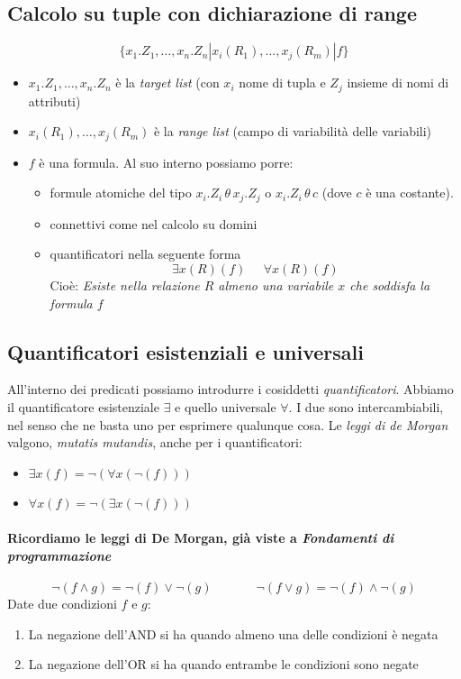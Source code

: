 \subsection{Calcolo su tuple con dichiarazione di range}
\[\{x_1.Z_1,\dots,x_n.Z_n | x_i(R_1),\dots,x_j(R_m) | f \}\]
\begin{itemize}
	\item $x_1.Z_1,\dots,x_n.Z_n$ è la \emph{target list} (con $x_i$ nome di tupla e $Z_j$ insieme di nomi di attributi)
	\item $x_i(R_1),\dots,x_j(R_m)$ è la \emph{range list} (campo di variabilità delle variabili)
	\item $f$ è una formula. Al suo interno possiamo porre:
	\begin{itemize}
		\item formule atomiche del tipo $x_i.Z_i \, \theta \, x_j.Z_j$ o $x_i.Z_i \, \theta \, c$ (dove $c$ è una costante).
		\item connettivi come nel calcolo su domini
		\item quantificatori nella seguente forma
		\[\exists x (R)(f)\;\;\;\;\;\forall x (R)(f)\]
		\small
		Cioè: \textit{Esiste nella relazione $R$ almeno una variabile $x$ che soddisfa la formula $f$}
		\normalsize
	\end{itemize}
\end{itemize}

\subsection{Quantificatori esistenziali e universali}
All'interno dei predicati possiamo introdurre i cosiddetti \emph{quantificatori}. Abbiamo il quantificatore esistenziale $\exists$ e quello universale $\forall$. I due sono intercambiabili, nel senso che ne basta uno per esprimere qualunque cosa. Le \emph{leggi di de Morgan} valgono, \emph{mutatis mutandis}, anche per i quantificatori:
\begin{itemize}
	\item $\exists x(f) = \neg(\forall x(\neg(f)))$
	\item $\forall x(f)=\neg(\exists x(\neg(f)))$
\end{itemize}
\paragraph{Ricordiamo le leggi di De Morgan, già viste a \emph{Fondamenti di programmazione}}
\[\boxed{\neg(f \land g)=\neg(f) \lor \neg(g)}\;\;\;\;\;\;\;\;\;\;\;\,\;\boxed{\neg(f\lor g) = \neg(f) \land \neg(g)}\]
Date due condizioni $f$ e $g$:
\begin{enumerate}
	\item La negazione dell'AND si ha quando almeno una delle condizioni è negata
	\item La negazione dell'OR si ha quando entrambe le condizioni sono negate
\end{enumerate}
